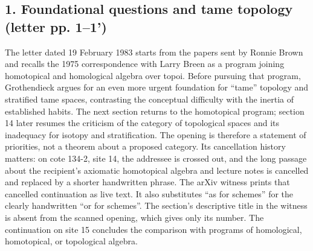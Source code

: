 \subsection*{1. Foundational questions and tame topology (letter pp. 1--1')}
The letter dated 19 February 1983 starts from the papers sent by Ronnie Brown and recalls the 1975 correspondence with Larry Breen as a program joining homotopical and homological algebra over topoi. Before pursuing that program, Grothendieck argues for an even more urgent foundation for ``tame'' topology and stratified tame spaces, contrasting the conceptual difficulty with the inertia of established habits. The next section returns to the homotopical program; section 14 later resumes the criticism of the category of topological spaces and its inadequacy for isotopy and stratification. The opening is therefore a statement of priorities, not a theorem about a proposed category. Its cancellation history matters: on cote 134-2, site 14, the addressee is crossed out, and the long passage about the recipient's axiomatic homotopical algebra and lecture notes is cancelled and replaced by a shorter handwritten phrase. The arXiv witness prints that cancelled continuation as live text. It also substitutes ``as for schemes'' for the clearly handwritten ``or for schemes''. The section's descriptive title in the witness is absent from the scanned opening, which gives only its number. The continuation on site 15 concludes the comparison with programs of homological, homotopical, or topological algebra.

